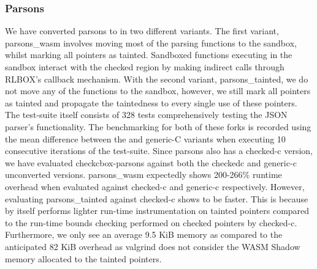 \subsubsection{Parsons}
We have converted parsons to \systemname in two different variants. The first variant, parsons\_wasm involves moving most of the parsing functions to the sandbox, whilst marking all pointers as tainted. Sandboxed functions executing in the sandbox interact with the checked region by making indirect calls through RLBOX's callback mechanism. With the second variant, parsons\_tainted, we do not move any of the functions to the sandbox, however, we still mark all pointers as tainted and propagate the taintedness to every single use of these pointers. The test-suite itself consists of 328 tests comprehensively testing the JSON parser's functionality. The benchmarking for both of these forks is recorded using the mean difference between the \systemname and generic-C variants when executing 10 consecutive iterations of the test-suite. Since parsons also has a checked-c version, we have evaluated checkcbox-parsons against both the checkedc and generic-c unconverted versions. parsons\_wasm expectedly shows 200-266\% runtime overhead when evaluated against checked-c and generic-c respectively. However, evaluating parsons\_tainted against checked-c shows \systemname to be faster. This is because \systemname by itself performs lighter run-time instrumentation on tainted pointers compared to the run-time bounds checking performed on checked pointers by checked-c. Furthermore, we only see an average 9.5 KiB memory as compared to the anticipated 82 KiB overhead as valgrind does not consider the WASM Shadow memory allocated to the tainted pointers. 

